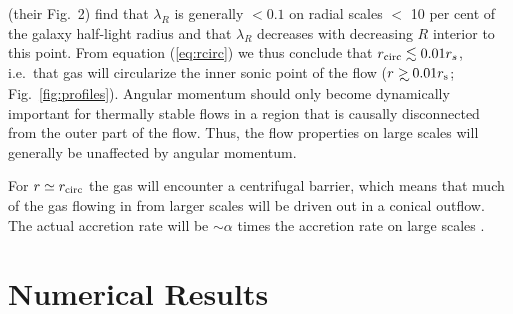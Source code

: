 \documentclass[usenatbib,fleqn]{mn2e}
\newcommand\gsim{\mathrel{\rlap{\lower4pt\hbox{\hskip1pt$\sim$}}
    \raise1pt\hbox{$>$}}}
\begin{document}
\citet{EmsellemCappellari+:2007a} (their Fig.~2) find that $\lambda_R$
is generally $< 0.1$ on radial scales $<$ 10 per cent of the galaxy
half-light radius and that $\lambda_R$ decreases with decreasing $R$
interior to this point.  From equation (\ref{eq:rcirc}) we thus
conclude that $r_{\rm circ} \lesssim 0.01r_{s}$, i.e.~that gas will
circularize the inner sonic point of the flow ($r\gsim 0.01r_{\rm s}$;
Fig.~\ref{fig:profiles}).  Angular momentum should only become
dynamically important for thermally stable flows in a region that is
causally disconnected from the outer part of the flow. Thus, the flow
properties on large scales will generally be unaffected by angular momentum.

For $r\simeq r_{\rm circ} $ the gas will encounter a centrifugal
barrier, which means that much of the gas flowing in from larger
scales will be driven out in a conical outflow. The actual accretion
rate will be $\sim\alpha$ times the accretion rate on large scales
\citep{Li+2013}.


\section{Numerical Results}
\label{sec:numerical}
\end{document}
